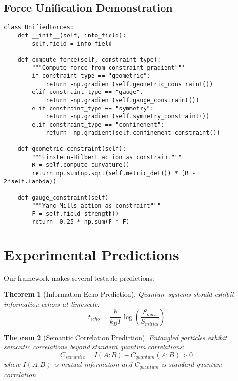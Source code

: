 \documentclass[12pt,a4paper]{article}
\newtheorem{theorem}{Theorem}[section]
\begin{document}
\subsection{Force Unification Demonstration}

\begin{lstlisting}
class UnifiedForces:
    def __init__(self, info_field):
        self.field = info_field
        
    def compute_force(self, constraint_type):
        """Compute force from constraint gradient"""
        if constraint_type == "geometric":
            return -np.gradient(self.geometric_constraint())
        elif constraint_type == "gauge":
            return -np.gradient(self.gauge_constraint())
        elif constraint_type == "symmetry":
            return -np.gradient(self.symmetry_constraint())
        elif constraint_type == "confinement":
            return -np.gradient(self.confinement_constraint())
    
    def geometric_constraint(self):
        """Einstein-Hilbert action as constraint"""
        R = self.compute_curvature()
        return np.sum(np.sqrt(self.metric_det()) * (R - 2*self.Lambda))
    
    def gauge_constraint(self):
        """Yang-Mills action as constraint"""
        F = self.field_strength()
        return -0.25 * np.sum(F * F)
\end{lstlisting}

\section{Experimental Predictions}

Our framework makes several testable predictions:

\begin{theorem}[Information Echo Prediction]
Quantum systems should exhibit information echoes at timescale:
\begin{equation}
t_{echo} = \frac{\hbar}{k_B T} \log\left(\frac{S_{max}}{S_{initial}}\right)
\end{equation}
\end{theorem}

\begin{theorem}[Semantic Correlation Prediction]
Entangled particles exhibit semantic correlations beyond standard quantum correlations:
\begin{equation}
C_{semantic} = I(A:B) - C_{quantum}(A:B) > 0
\end{equation}
where $I(A:B)$ is mutual information and $C_{quantum}$ is standard quantum correlation.
\end{theorem}
\end{document}
